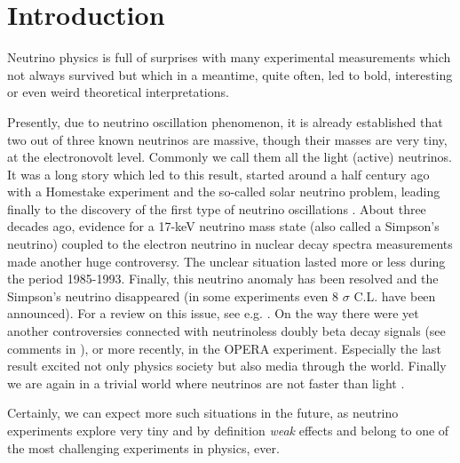\documentclass[twocolumn,superscriptaddress,showpacs,prl,nofootinbib,floatfix]{revtex4}
\begin{document}



\maketitle 
\allowdisplaybreaks


\section{Introduction}

Neutrino physics is full of surprises with many  experimental measurements which not always survived but which in a meantime, quite often, led to bold, interesting or even weird theoretical interpretations. 

Presently, due to neutrino oscillation phenomenon, it is already
established that two out of three known neutrinos are massive, though their masses are very tiny, at the electronovolt level. Commonly we call them all the light (active) neutrinos. It was a long story which led to this result, started around a half century ago with a Homestake experiment and the so-called solar neutrino problem, leading finally to the discovery of the first type of neutrino oscillations \cite{Bahcall:1976zz}. About three decades ago, evidence for a 17-keV neutrino mass state (also called a Simpson's neutrino) coupled to the electron neutrino in nuclear decay spectra measurements made another huge controversy. The unclear situation lasted more or less during the period 1985-1993. Finally, this neutrino anomaly has been resolved and the Simpson's neutrino disappeared (in some experiments even 8 $\sigma$ C.L. have been announced). For a review on this issue, see e.g. \cite{Wietfeldt:1995ja,Franklin:1995pk}.  
On the way there were yet another controversies connected with neutrinoless doubly beta decay signals (see comments in \cite{Akhmedov:2014kxa}), or more recently, in the OPERA experiment.
Especially the last result excited not only physics society but also media through the world. Finally we are again in a trivial world where neutrinos are not faster than light \cite{Antonello:2012hg}. 

Certainly, we can expect more such situations in the future, as neutrino experiments explore very tiny and by definition {\it weak} effects and belong to one of the most challenging experiments in physics, ever. 
\end{document}
